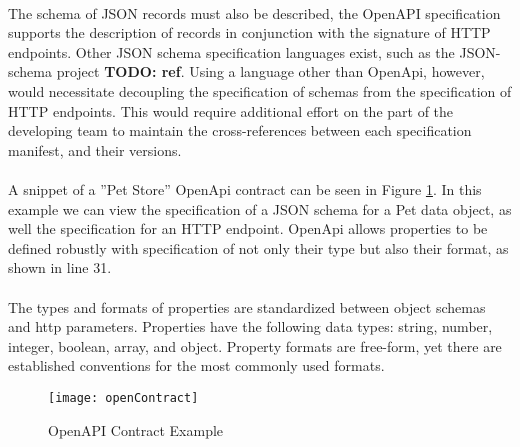 \paragraph{}

The schema of JSON records must also be described,
the OpenAPI specification supports the description of records
in conjunction with the signature of HTTP endpoints.
Other JSON schema specification languages exist, such as the JSON-schema project \textbf{TODO: ref}.
Using a language other than OpenApi, however, would necessitate decoupling the specification of schemas from the specification of HTTP endpoints.
This would require additional effort on the part of the developing team to maintain the cross-references
between each specification manifest, and their versions.

\paragraph{}

A snippet of a ''Pet Store'' OpenApi contract can be seen in Figure \ref{fig:open_contract}.
In this example we can view the specification of a JSON schema for a Pet data object,
as well the specification for an HTTP endpoint.
OpenApi allows properties to be defined robustly with specification of not only their type but also their format, as shown in line 31.

\paragraph{}

The types and formats of properties are standardized between object schemas and http parameters.
Properties have the following data types: string, number, integer, boolean, array, and object.
Property formats are free-form, yet there are established conventions for the most commonly used formats.

\begin{figure}[htbp]
    \centering
    \centerline{\texttt{[image: openContract]}}
    \caption{OpenAPI Contract Example}
    \label{fig:open_contract}
\end{figure}

\newpage


